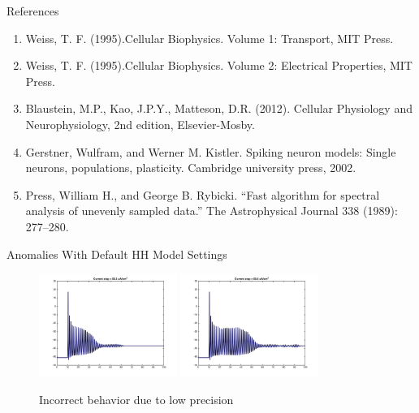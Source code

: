 \documentclass{beamer}
\begin{document}
\begin{frame}{References}
\begin{enumerate}
\item Weiss, T. F. (1995).Cellular Biophysics. Volume 1: Transport, MIT Press.
\item Weiss, T. F. (1995).Cellular Biophysics. Volume 2: Electrical Properties, MIT Press.
\item Blaustein, M.P., Kao, J.P.Y., Matteson, D.R. (2012). Cellular Physiology and Neurophysiology, 2nd edition, Elsevier-Mosby.
\item Gerstner, Wulfram, and Werner M. Kistler. Spiking neuron models: Single neurons, populations, plasticity. Cambridge university press, 2002.
\item Press, William H., and George B. Rybicki. ``Fast algorithm for spectral analysis of unevenly sampled data.'' The Astrophysical Journal 338 (1989): 277--280.
\end{enumerate}
\end{frame}

\begin{frame}{Anomalies With Default HH Model Settings}
  \begin{figure}
    \centering
    \includegraphics[width = 0.4\textwidth]{./images/current55p5.jpg}
    \includegraphics[width = 0.4\textwidth]{./images/current55p6.jpg}

    Incorrect behavior due to low precision
  \end{figure}
\end{frame}
\end{document}
